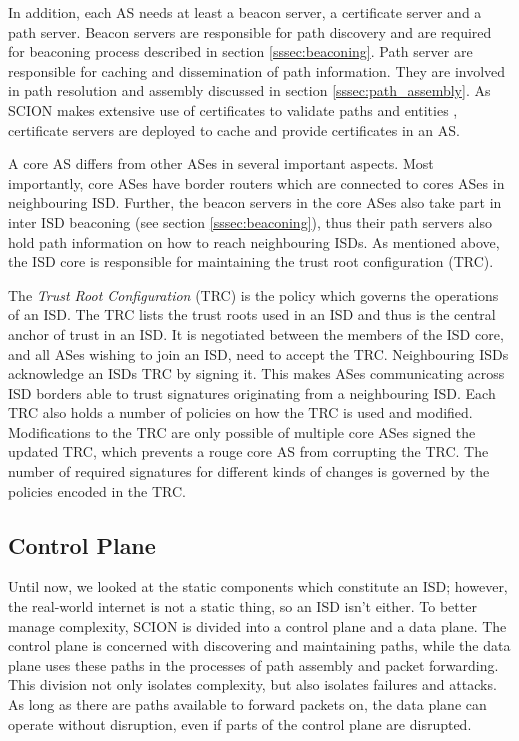 \documentclass[../eva1_scion.tex]{subfiles}
\begin{document}
    In addition, each AS needs at least a beacon server, a certificate server and a path server. Beacon servers are responsible for path discovery and are required for beaconing process described in section \ref{sssec:beaconing}. Path server are responsible for caching and dissemination of path information. They are involved in path resolution and assembly discussed in section \ref{sssec:path_assembly}. As SCION makes extensive use of certificates to validate paths and entities \cite{scion_2011}, certificate servers are deployed to cache and provide certificates in an AS.

    A core AS differs from other ASes in several important aspects. Most importantly, core ASes have border routers which are connected to cores ASes in neighbouring ISD. Further, the beacon servers in the core ASes also take part in inter ISD beaconing (see section \ref{sssec:beaconing}), thus their path servers also hold path information on how to reach neighbouring ISDs. As mentioned above, the ISD core is responsible for maintaining the trust root configuration (TRC).

    The \textit{Trust Root Configuration} (TRC) is the policy which governs the operations of an ISD. The TRC lists the trust roots used in an ISD and thus is the central anchor of trust in an ISD. It is negotiated between the members of the ISD core, and all ASes wishing to join an ISD, need to accept the TRC. Neighbouring ISDs acknowledge an ISDs TRC by signing it. This makes ASes communicating across ISD borders able to trust signatures originating from a neighbouring ISD. Each TRC also holds a number of policies on how the TRC is used and modified. Modifications to the TRC are only possible of multiple core ASes signed the updated TRC, which prevents a rouge core AS from corrupting the TRC. The number of required signatures for different kinds of changes is governed by the policies encoded in the TRC.

    \subsection{Control Plane} \label{ssec:control_plane}
    Until now, we looked at the static components which constitute an ISD; however, the real-world internet is not a static thing, so an ISD isn't either. To better manage complexity, SCION is divided into a control plane and a data plane. The control plane is concerned with discovering and maintaining paths, while the data plane uses these paths in the processes of path assembly and packet forwarding. This division not only isolates complexity, but also isolates failures and attacks. As long as there are paths available to forward packets on, the data plane can operate without disruption, even if parts of the control plane are disrupted.
\end{document}

